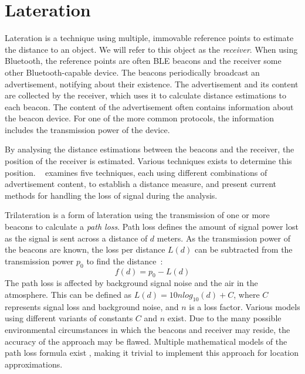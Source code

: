 \section{Lateration}
Lateration is a technique using multiple, immovable reference points to estimate the distance to an object\cite{presence_ble_review}.
We will refer to this object as the \textit{receiver}.
When using Bluetooth, the reference points are often BLE beacons and the receiver some other Bluetooth-capable device. 
The beacons periodically broadcast an advertisement, notifying about their existence.\cite{apple2023ibeacon} 
The advertisement and its content are collected by the receiver, which uses it to calculate distance estimations to each beacon. 
The content of the advertisement often contains information about the beacon device. 
For one of the more common protocols, the information includes the transmission power of the device\cite{apple2023ibeacon}.

By analysing the distance estimations between the beacons and the receiver, the position of the receiver is estimated.
Various techniques exists to determine this position.
\citeauthor{presence_ble_review}~\cite{presence_ble_review} examines five techniques, each using different combinations of advertisement content, to establish a distance measure, and present current methods for handling the loss of signal during the analysis.

Trilateration is a form of lateration using the transmission of one or more beacons to calculate a \textit{path loss}.
Path loss defines the amount of signal power lost as the signal is sent across a distance of $d$ meters.
As the transmission power of the beacons are known, the loss per distance $L(d)$ can be subtracted from the transmission power $p_0$ to find the distance~\cite{taking_localization_to_the_wild}:
\begin{equation}
    f(d) = p_0 - L(d)
\end{equation}
The path loss is affected by background signal noise and the air in the atmosphere.
This can be defined as $L(d) = 10n log_{10}(d)+C$, where $C$ represents signal loss and background noise, and $n$ is a loss factor. \cite{taking_localization_to_the_wild}
Various models using different variants of constants $C$ and $n$ exist\cite{path_loss_models}.
Due to the many possible environmental circumstances in which the beacons and receiver may reside, the accuracy of the approach may be flawed\cite{presence_ble_review}. 
Multiple mathematical models of the path loss formula exist \cite{rssi_indoor_pos,positioning_alg_rssi, RSSI_ZigBee_distance}, making it trivial to implement this approach for location approximations.